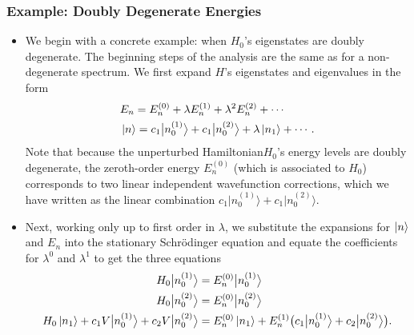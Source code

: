 \documentclass[11pt, a4paper]{article}
\newcommand{\Schro}{Schr\"{o}dinger\xspace}
\newcommand{\Ham}{Hamiltonian\xspace}
\newcommand{\bket}[1]{\big | {#1} \big \rangle }
\begin{document}
\subsubsection{Example: Doubly Degenerate Energies}
\begin{itemize}
    \item We begin with a concrete example: when $ H_{0} $'s eigenstates are doubly degenerate. The beginning steps of the analysis are the same as for a non-degenerate spectrum. We first expand $ H $'s eigenstates and eigenvalues in the form
    \begin{align*}
        &E_{n} = E_{n}^{(0)} + \lambda E_{n}^{(1)} + \lambda^{2} E_{n}^{(2)} + \cdots\\
        &\ket{n} = c_{1}\bket{n_{0}^{(1)}} + c_{1}\bket{n_{0}^{(2)}} + \lambda \ket{n_{1}} +  \cdots.
    \end{align*}
    Note that because the unperturbed \Ham $ H_{0} $'s energy levels are doubly degenerate, the zeroth-order energy $ E_{n}^{(0)} $ (which is associated to $ H_{0} $) corresponds to two linear independent wavefunction corrections, which we have written as the linear combination $ c_{1}\bket{n_{0}^{(1)}} + c_{1}\bket{n_{0}^{(2)}} $. 

    \item Next, working only up to first order in $ \lambda $, we substitute the expansions for $ \ket{n} $ and $ E_{n} $ into the stationary \Schro equation and equate the coefficients for $ \lambda^{0} $ and $ \lambda^{1} $ to get the three equations
    \begin{align*}
        H_{0} \bket{n_{0}^{(1)}} &= E_{n}^{(0)} \bket{n_{0}^{(1)}}\\
        H_{0} \bket{n_{0}^{(2)}} &= E_{n}^{(0)} \bket{n_{0}^{(2)}}\\
        H_{0}\ket{n_{1}} + c_{1}V \bket{n_{0}^{(1)}} + c_{2}V \bket{n_{0}^{(2)}} &= E_{n}^{(0)} \ket{n_{1}} + E_{n}^{(1)} \big( c_{1}\bket{n_{0}^{(1)}} + c_{2}\bket{n_{0}^{(2)}} \big).
    \end{align*}
    

\end{itemize}
\end{document}
